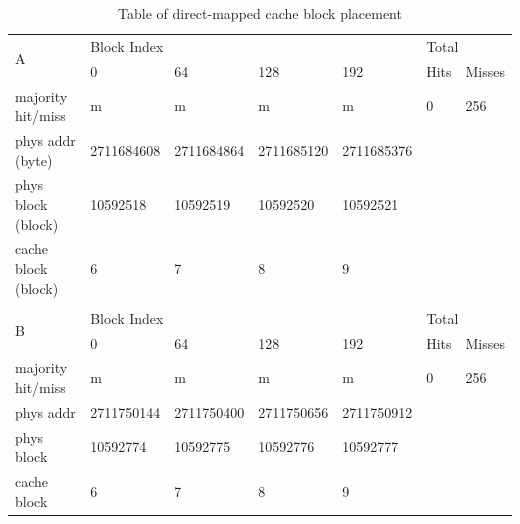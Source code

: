\documentclass[12pt]{article}
\begin{document}
\begin{table}[H]
\centering
\caption{Table of direct-mapped cache block placement}
\begin{tabular}{lllllll}
\multicolumn{1}{l|}{\multirow{2}{*}{A}}  & \multicolumn{4}{l|}{Block Index}                                       & \multicolumn{2}{l}{Total} \\
\multicolumn{1}{l|}{}                    & 0          & 64         & 128        & \multicolumn{1}{l|}{192}        & Hits       & Misses       \\ \hline
\multicolumn{1}{l|}{majority hit/miss}   & m          & m          & m          & \multicolumn{1}{l|}{m}          & 0          & 256          \\
\multicolumn{1}{l|}{phys addr (byte)}    & 2711684608 & 2711684864 & 2711685120 & \multicolumn{1}{l|}{2711685376} &            &              \\
\multicolumn{1}{l|}{phys block (block)}  & 10592518   & 10592519   & 10592520   & \multicolumn{1}{l|}{10592521}   &            &              \\
\multicolumn{1}{l|}{cache block (block)} & 6          & 7          & 8          & \multicolumn{1}{l|}{9}          &            &              \\
                                         &            &            &            &                                 &            &              \\
\multicolumn{1}{l|}{\multirow{2}{*}{B}}  & \multicolumn{4}{l|}{Block Index}                                       & \multicolumn{2}{l}{Total} \\
\multicolumn{1}{l|}{}                    & 0          & 64         & 128        & \multicolumn{1}{l|}{192}        & Hits       & Misses       \\ \hline
\multicolumn{1}{l|}{majority hit/miss}   & m          & m          & m          & \multicolumn{1}{l|}{m}          & 0          & 256          \\
\multicolumn{1}{l|}{phys addr}           & 2711750144 & 2711750400 & 2711750656 & \multicolumn{1}{l|}{2711750912} &            &              \\
\multicolumn{1}{l|}{phys block}          & 10592774   & 10592775   & 10592776   & \multicolumn{1}{l|}{10592777}   &            &              \\
\multicolumn{1}{l|}{cache block}         & 6          & 7          & 8          & \multicolumn{1}{l|}{9}          &            &              \\

\end{tabular}
\end{table}
\end{document}
